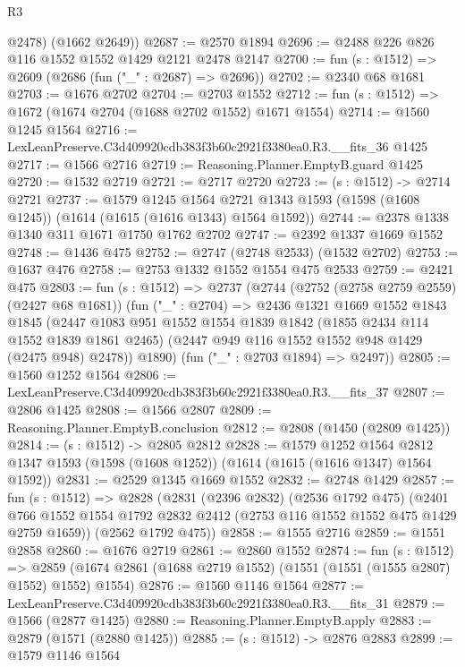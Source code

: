 \begin{lexlean}{R3}
\begin{coremodule}
        @2478)
      (@1662 @2649))
@2687 := @2570 @1894
@2696 := @2488 @226 @826 @116 @1552 @1552 @1429 @2121 @2478 @2147
@2700 := fun (s : @1512) => @2609 (@2686 (fun ("_" : @2687) => @2696))
@2702 := @2340 @68 @1681
@2703 := @1676 @2702
@2704 := @2703 @1552
@2712 := fun (s : @1512) => @1672 (@1674 @2704 (@1688 @2702 @1552) @1671 @1554)
@2714 := @1560 @1245 @1564
@2716 := LexLeanPreserve.C3d409920cdb383f3b60c2921f3380ea0.R3.__fits_36 @1425
@2717 := @1566 @2716
@2719 := Reasoning.Planner.EmptyB.guard @1425
@2720 := @1532 @2719
@2721 := @2717 @2720
@2723 := (s : @1512) -> @2714 @2721
@2737 := @1579
    @1245
    @1564
    @2721
    @1343
    @1593
    (@1598 (@1608 @1245))
    (@1614 (@1615 (@1616 @1343) @1564 @1592))
@2744 := @2378 @1338 @1340 @311 @1671 @1750 @1762 @2702
@2747 := @2392 @1337 @1669 @1552
@2748 := @1436 @475
@2752 := @2747 (@2748 @2533) (@1532 @2702)
@2753 := @1637 @476
@2758 := @2753 @1332 @1552 @1554 @475 @2533
@2759 := @2421 @475
@2803 := fun (s : @1512) =>
  @2737
    (@2744
      (@2752 (@2758 @2759 @2559) (@2427 @68 @1681))
      (fun ("_" : @2704) =>
      @2436
        @1321
        @1669
        @1552
        @1843
        @1845
        (@2447
          @1083
          @951
          @1552
          @1554
          @1839
          @1842
          (@1855 @2434 @114 @1552 @1839 @1861 @2465)
          (@2447 @949 @116 @1552 @1552 @948 @1429 (@2475 @948) @2478))
        @1890)
      (fun ("_" : @2703 @1894) => @2497))
@2805 := @1560 @1252 @1564
@2806 := LexLeanPreserve.C3d409920cdb383f3b60c2921f3380ea0.R3.__fits_37
@2807 := @2806 @1425
@2808 := @1566 @2807
@2809 := Reasoning.Planner.EmptyB.conclusion
@2812 := @2808 (@1450 (@2809 @1425))
@2814 := (s : @1512) -> @2805 @2812
@2828 := @1579
    @1252
    @1564
    @2812
    @1347
    @1593
    (@1598 (@1608 @1252))
    (@1614 (@1615 (@1616 @1347) @1564 @1592))
@2831 := @2529 @1345 @1669 @1552
@2832 := @2748 @1429
@2857 := fun (s : @1512) =>
  @2828
    (@2831
      (@2396 @2832)
      (@2536 @1792 @475)
      (@2401 @766 @1552 @1554 @1792 @2832 @2412 (@2753 @116 @1552 @1552 @475 @1429 @2759 @1659))
      (@2562 @1792 @475))
@2858 := @1555 @2716
@2859 := @1551 @2858
@2860 := @1676 @2719
@2861 := @2860 @1552
@2874 := fun (s : @1512) =>
  @2859 (@1674 @2861 (@1688 @2719 @1552) (@1551 (@1551 (@1555 @2807) @1552) @1552) @1554)
@2876 := @1560 @1146 @1564
@2877 := LexLeanPreserve.C3d409920cdb383f3b60c2921f3380ea0.R3.__fits_31
@2879 := @1566 (@2877 @1425)
@2880 := Reasoning.Planner.EmptyB.apply
@2883 := @2879 (@1571 (@2880 @1425))
@2885 := (s : @1512) -> @2876 @2883
@2899 := @1579
    @1146
    @1564

\end{coremodule}
\end{lexlean}
